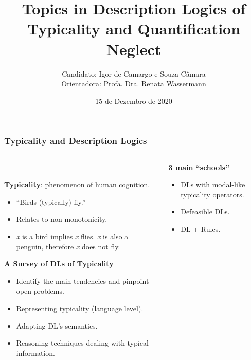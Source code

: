 \documentclass[12pt]{beamer}
\title{Topics in Description Logics of Typicality and Quantification Neglect}
\date{15 de Dezembro de 2020}
\author{Candidato: Igor de Camargo e Souza Câmara \\
Orientadora: Profa. Dra. Renata Wassermann}
\institute{IME - USP}
\newcommand{\definc}{\mathrel{\substack{
\textstyle\sqsubset\\[-0.2ex]\textstyle\sim}}}
\begin{document}

\appendix %

\begin{frame}
\frametitle{Typicality and Description Logics}
\begin{columns}
\begin{column}{0.6\textwidth}
   ~\\
   { 
   \footnotesize \textbf{Typicality}: phenomenon of human cognition. %
\begin{itemize}
    \itemsep-0.3em 
    \item “Birds (typically) fly.”
    \item Relates to non-monotonicity.
    \item \textit{x} is a bird implies \textit{x} flies. \textit{x} is also a penguin, therefore \textit{x} does not fly.
\end{itemize}

\textbf{A Survey of DLs of Typicality}

\begin{itemize}
    \itemsep-0.3em 
    \item Identify the main tendencies and pinpoint open-problems.
    \item Representing typicality (language level).
    \item Adapting DL’s semantics.
    \item Reasoning techniques dealing with typical information.
\end{itemize}
}
\end{column}

\begin{column}{0.55\textwidth}  %
    
{\footnotesize 
    
\textbf{3 main “schools”}
\vspace{-0.7em}
\begin{itemize}
    \itemsep-0.3em
    \item DLs with modal-like typicality operators. %
    \item Defeasible DLs. %
    \item DL + Rules.
\end{itemize}

}
\end{column}
\end{columns}
\end{frame}
\end{document}
